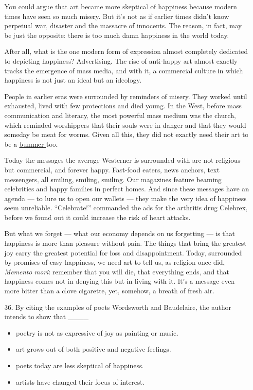 \documentclass[UTF8,11pt]{ctexart}
\begin{document}
You could argue that art became more skeptical of happiness because modern times have seen so much misery. But it’s not as if earlier times didn’t know perpetual war, disaster and the massacre of innocents. The reason, in fact, may be just the opposite: there is too much damn happiness in the world today.


After all, what is the one modern form of expression almost completely dedicated to depicting happiness? Advertising. The rise of anti-happy art almost exactly tracks the emergence of mass media, and with it, a commercial culture in which happiness is not just an ideal but an ideology.


People in earlier eras were surrounded by reminders of misery. They worked until exhausted, lived with few protections and died young. In the West, before mass communication and literacy, the most powerful mass medium was the church, which reminded worshippers that their souls were in danger and that they would someday be meat for worms. Given all this, they did not exactly need their art to be a \uline{bummer }too.


Today the messages the average Westerner is surrounded with are not religious but commercial, and forever happy. Fast-food eaters, news anchors, text messengers, all smiling, smiling, smiling. Our magazines feature beaming celebrities and happy families in perfect homes. And since these messages have an agenda — to lure us to open our wallets — they make the very idea of happiness seem unreliable. “Celebrate!” commanded the ads for the arthritis drug Celebrex, before we found out it could increase the risk of heart attacks.


But what we forget — what our economy depends on us forgetting — is that happiness is more than pleasure without pain. The things that bring the greatest joy carry the greatest potential for loss and disappointment. Today, surrounded by promises of easy happiness, we need art to tell us, as religion once did, \textit{Memento mori}: remember that you will die, that everything ends, and that happiness comes not in denying this but in living with it. It’s a message even more bitter than a clove cigarette, yet, somehow, a breath of fresh air.


36. By citing the examples of poets Wordsworth and Baudelaire, the author intends to show that \_\_\_\_


\begin{itemize}[leftmargin=2em,itemsep=.2em,topsep=.4em]\item[A.] poetry is not as expressive of joy as painting or music.
\item[B.] art grows out of both positive and negative feelings.
\item[C.] poets today are less skeptical of happiness.
\item[D.] artists have changed their focus of interest.
\end{itemize}
\end{document}
